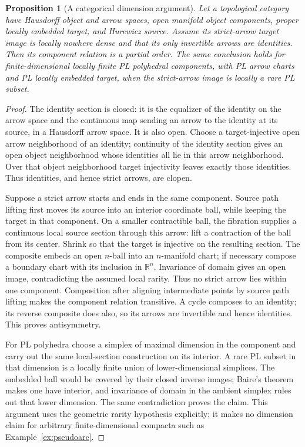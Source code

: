 \documentclass[11pt,a4paper]{article}
\newtheorem{proposition}[theorem]{Proposition}
\theoremstyle{definition}
\newcommand{\R}{\mathbb R}
\begin{document}
\begin{proposition}[A categorical dimension argument]\label{prop:category-order}
Let a topological category have Hausdorff object and arrow spaces,
open manifold object components, proper locally embedded target, and
Hurewicz source. Assume its strict-arrow target image is locally nowhere
dense and that its only invertible arrows are identities. Then its component relation
is a partial order. The same conclusion holds for finite-dimensional locally finite PL
polyhedral components, with PL arrow charts and PL locally embedded
target, when the strict-arrow image is locally a rare PL subset.
\end{proposition}
\begin{proof}
The identity section is closed: it is the equalizer of the identity
on the arrow space and the continuous map sending an arrow to the
identity at its source, in a Hausdorff arrow space. It is also open.
Choose a target-injective open arrow neighborhood of an identity;
continuity of the identity section gives an open object neighborhood
whose identities all lie in this arrow neighborhood. Over that object
neighborhood target injectivity leaves exactly those identities.
Thus identities, and hence strict arrows, are clopen.

Suppose a strict arrow starts and ends in the same component.
Source path lifting first moves its source into an interior coordinate
ball, while keeping the target in that component. On a smaller
contractible ball, the fibration supplies a continuous local source
section through this arrow: lift a contraction of the ball from its
center. Shrink so that the target is injective on the resulting
section. The composite embeds an open $n$-ball into an $n$-manifold
chart; if necessary compose a boundary chart with its inclusion in
$\R^n$. Invariance of domain gives an open image, contradicting the
assumed local rarity. Thus no strict arrow lies within one component.
Composition after aligning intermediate points by source path lifting
makes the component relation transitive. A cycle composes to an
identity; its reverse composite does also, so its arrows are invertible
and hence identities. This proves antisymmetry.

For PL polyhedra choose a simplex of maximal dimension in the component
and carry out the same local-section construction on its interior.
A rare PL subset in that dimension is a locally finite union of
lower-dimensional simplices. The embedded ball would be covered by
their closed inverse images; Baire's theorem makes one have interior,
and invariance of domain in the ambient simplex rules out that lower
dimension. The same contradiction proves the claim. This argument uses
the geometric rarity hypothesis explicitly; it makes no dimension
claim for arbitrary finite-dimensional compacta such as
Example~\ref{ex:pseudoarc}.
\end{proof}
\end{document}
